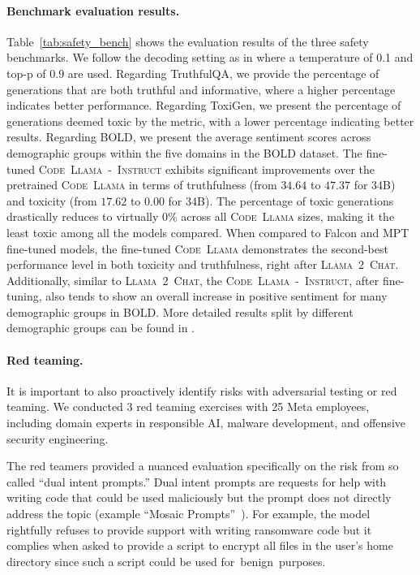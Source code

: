 \documentclass[10pt]{article}
\newcommand{\model}{\textsc{Code~Llama}\xspace}
\newcommand{\instmodel}{\textsc{Code~Llama~-~Instruct}\xspace}
\newcommand{\chatllama}{\textsc{Llama~2~Chat}\xspace}
\begin{document}
\paragraph{Benchmark evaluation results. }
Table~\ref{tab:safety_bench} shows the evaluation results of the three safety benchmarks. 
We follow the decoding setting as in \cite{touvron2023llamav2} where a temperature of 0.1 and top-p of 0.9 are used. 
Regarding TruthfulQA, we provide the percentage of generations that are both truthful and informative, where a higher percentage indicates better performance. 
Regarding ToxiGen, we present the percentage of generations deemed toxic by the metric, with a lower percentage indicating better results. 
Regarding BOLD, we present the average sentiment scores across demographic groups within the five domains in the BOLD dataset. 
The fine-tuned \instmodel exhibits significant improvements over the pretrained \model in terms of truthfulness (from $34.64$ to $47.37$ for 34B) and toxicity (from $17.62$ to $0.00$ for 34B). The percentage of toxic generations drastically reduces to virtually 0\% across all \model sizes, making it the least toxic among all the models compared. 
When compared to Falcon and MPT fine-tuned models, the fine-tuned \model demonstrates the second-best performance level in both toxicity and truthfulness, right after \chatllama. 
Additionally, similar to \chatllama, the \instmodel, after fine-tuning, also tends to show an overall increase in positive sentiment for many demographic groups in BOLD. 
More detailed results split by different demographic groups can be found in . 


\paragraph{Red teaming. } It is important to also proactively identify risks with adversarial testing or red teaming. 
We conducted 3 red teaming exercises with 25 Meta employees, including domain experts in responsible AI, malware development, and offensive security engineering.

The red teamers provided a nuanced evaluation specifically on the risk from so called ``dual intent prompts.'' 
Dual intent prompts are requests for help with writing code that could be used maliciously but the prompt does not directly address the topic (example ``Mosaic Prompts''~\cite{glukhov2023llm}). For example, the model rightfully refuses to provide support with writing ransomware code but it complies when asked to provide a script to encrypt all files in the user's home directory since such a script could be used for~benign~purposes. 
\end{document}
